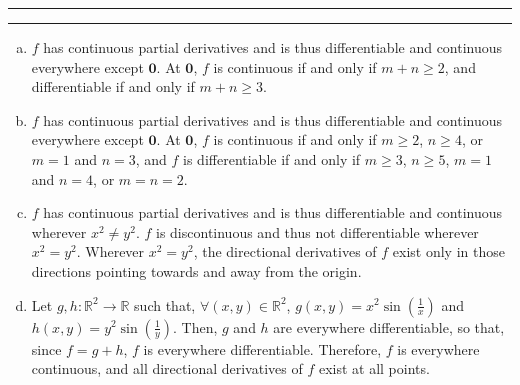 \documentclass[11pt]{article}
\newcounter{questionCounter}
\newcounter{partCounter}[questionCounter]
\newenvironment{question}[2][\arabic{questionCounter}]{%
    \setcounter{partCounter}{0}%
    \vspace{.25in} \hrule \vspace{0.5em}%
        \noindent{\bf #2}%
    \vspace{0.8em} \hrule \vspace{.10in}%
    \addtocounter{questionCounter}{1}%
}{}
\begin{document}
\begin{question}{Problem 4}
\begin{enumerate}[(a)]
\item $f$ has continuous partial derivatives and is thus differentiable and
continuous everywhere except $\mathbf{0}$. At $\mathbf{0}$, $f$ is continuous
if and only if $m + n \geq 2$, and differentiable if and only if
$m + n \geq 3$.

\item $f$ has continuous partial derivatives and is thus differentiable and
continuous everywhere except $\mathbf{0}$. At $\mathbf{0}$, $f$ is continuous
if and only if $m \geq 2$, $n \geq 4$, or $m = 1$ and $n = 3$, and $f$ is
differentiable if and only if $m \geq 3$, $n \geq 5$, $m = 1$ and $n = 4$, or
$m = n = 2$.

\item $f$ has continuous partial derivatives and is thus differentiable and
continuous wherever $x^2 \neq y^2$. $f$ is discontinuous and thus not
differentiable wherever $x^2 = y^2$. Wherever $x^2 = y^2$, the directional
derivatives of $f$ exist only in those directions pointing towards and away
from the origin.

\item Let $g, h: \mathbb{R}^2 \rightarrow \mathbb{R}$ such that, $\forall (x,y) \in \mathbb{R}^2$,
$g(x,y) = x^2 \sin\left(\frac{1}{x}\right)$ and $h(x,y) = y^2 \sin\left(\frac{1}{y}\right)$.
Then, $g$ and $h$ are everywhere differentiable, so that, since $f = g + h$, $f$ is everywhere
differentiable. Therefore, $f$ is everywhere continuous, and all directional derivatives of $f$
exist at all points.
\end{enumerate}
\end{question}
\end{document}

